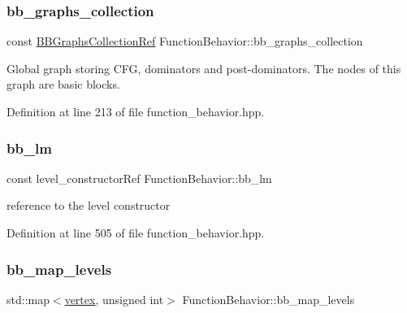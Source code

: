 \subsubsection{\texorpdfstring{bb\+\_\+graphs\+\_\+collection}{bb\_graphs\_collection}}
{\footnotesize\ttfamily const \hyperlink{basic__block_8hpp_ab2c15dfa325570d7a3e0e364c2f5fdfa}{B\+B\+Graphs\+Collection\+Ref} Function\+Behavior\+::bb\+\_\+graphs\+\_\+collection\hspace{0.3cm}{\ttfamily [private]}}



Global graph storing C\+FG, dominators and post-\/dominators. The nodes of this graph are basic blocks. 



Definition at line 213 of file function\+\_\+behavior.\+hpp.

\mbox{\label{classFunctionBehavior_a0a756f4d5755287942bf6bb953820412}} 
\subsubsection{\texorpdfstring{bb\+\_\+lm}{bb\_lm}}
{\footnotesize\ttfamily const level\+\_\+constructor\+Ref Function\+Behavior\+::bb\+\_\+lm}



reference to the level constructor 



Definition at line 505 of file function\+\_\+behavior.\+hpp.

\mbox{\label{classFunctionBehavior_aab66e36d4807146da5e9fef87cf1debc}} 
\subsubsection{\texorpdfstring{bb\+\_\+map\+\_\+levels}{bb\_map\_levels}}
{\footnotesize\ttfamily std\+::map$<$\hyperlink{graph_8hpp_abefdcf0544e601805af44eca032cca14}{vertex}, unsigned int$>$ Function\+Behavior\+::bb\+\_\+map\+\_\+levels\hspace{0.3cm}{\ttfamily [private]}}



